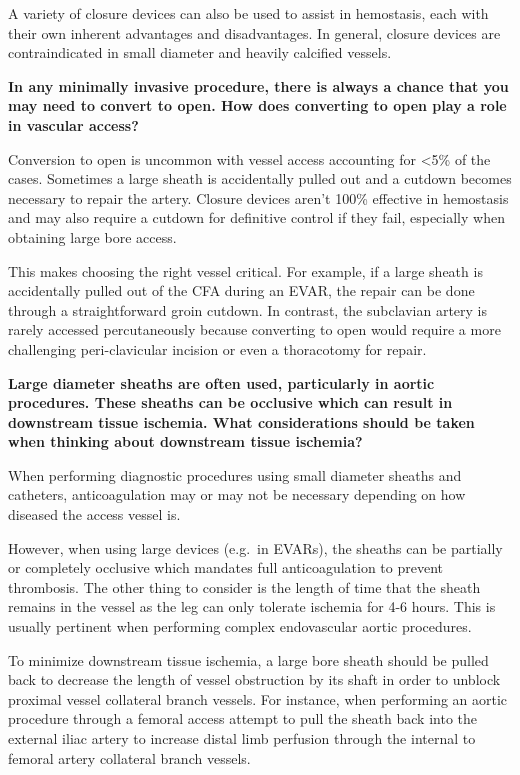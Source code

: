 \documentclass[
]{book}
\begin{document}
A variety of closure devices can also be used to assist in hemostasis,
each with their own inherent advantages and disadvantages. In general,
closure devices are contraindicated in small diameter and heavily
calcified vessels.

\textbf{In any minimally invasive procedure, there is always a chance that you
may need to convert to open. How does converting to open play a role in
vascular access?}

Conversion to open is uncommon with vessel access accounting for \textless5\% of
the cases. Sometimes a large sheath is accidentally pulled out and a
cutdown becomes necessary to repair the artery. Closure devices aren't
100\% effective in hemostasis and may also require a cutdown for
definitive control if they fail, especially when obtaining large bore
access.

This makes choosing the right vessel critical. For example, if a large
sheath is accidentally pulled out of the CFA during an EVAR, the repair
can be done through a straightforward groin cutdown. In contrast, the
subclavian artery is rarely accessed percutaneously because converting
to open would require a more challenging peri-clavicular incision or
even a thoracotomy for repair.

\textbf{Large diameter sheaths are often used, particularly in aortic
procedures. These sheaths can be occlusive which can result in
downstream tissue ischemia. What considerations should be taken when
thinking about downstream tissue ischemia?}

When performing diagnostic procedures using small diameter sheaths and
catheters, anticoagulation may or may not be necessary depending on how
diseased the access vessel is.

However, when using large devices (e.g.~in EVARs), the sheaths can be
partially or completely occlusive which mandates full anticoagulation to
prevent thrombosis. The other thing to consider is the length of time
that the sheath remains in the vessel as the leg can only tolerate
ischemia for 4-6 hours. This is usually pertinent when performing
complex endovascular aortic procedures.

To minimize downstream tissue ischemia, a large bore sheath should be
pulled back to decrease the length of vessel obstruction by its shaft in
order to unblock proximal vessel collateral branch vessels. For
instance, when performing an aortic procedure through a femoral access
attempt to pull the sheath back into the external iliac artery to
increase distal limb perfusion through the internal to femoral artery
collateral branch vessels.
\end{document}
